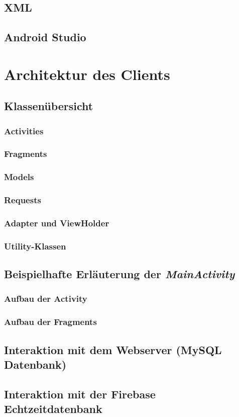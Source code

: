 \documentclass[../main.tex]{subfiles}
\begin{document}
	\subsection{XML}
	\subsection{Android Studio}
	
	
	\section{Architektur des Clients}
	\subsection{Klassenübersicht}
	\subsubsection{Activities}
	\subsubsection{Fragments}
	\subsubsection{Models}
	\subsubsection{Requests}
	\subsubsection{Adapter und ViewHolder}
	\subsubsection{Utility-Klassen}
	
	\subsection{Beispielhafte Erläuterung der \emph{MainActivity}}
	\subsubsection{Aufbau der Activity}
	\subsubsection{Aufbau der Fragments}
	
	\subsection{Interaktion mit dem Webserver (MySQL Datenbank)}
	\subsection{Interaktion mit der Firebase Echtzeitdatenbank}
	
\end{document}
